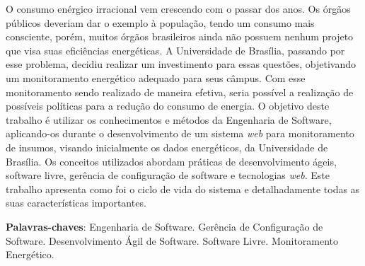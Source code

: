 \begin{resumo}
O consumo enérgico irracional vem crescendo com o passar dos anos. Os órgãos públicos deveriam dar o exemplo à população, tendo um consumo mais consciente, porém, muitos órgãos brasileiros ainda não possuem nenhum projeto que visa suas eficiências energéticas. A Universidade de Brasília, passando por esse problema, decidiu realizar um investimento para essas questões, objetivando um monitoramento energético adequado para seus câmpus. Com esse monitoramento sendo realizado de maneira efetiva, seria possível a realização de possíveis políticas para a redução do consumo de energia. O objetivo deste trabalho é utilizar os conhecimentos e métodos da Engenharia de Software, aplicando-os durante o desenvolvimento de um sistema \textit{web} para monitoramento de insumos, visando inicialmente os dados energéticos, da Universidade de Brasília. Os conceitos utilizados abordam práticas de desenvolvimento ágeis, software livre, gerência de configuração de software e tecnologias \textit{web}. Este trabalho apresenta como foi o ciclo de vida do sistema e detalhadamente todas as suas características importantes.

 \vspace{\onelineskip}

 \noindent
 \textbf{Palavras-chaves}: Engenharia de Software. Gerência de Configuração de Software. Desenvolvimento Ágil de Software. Software Livre. Monitoramento Energético.
\end{resumo}